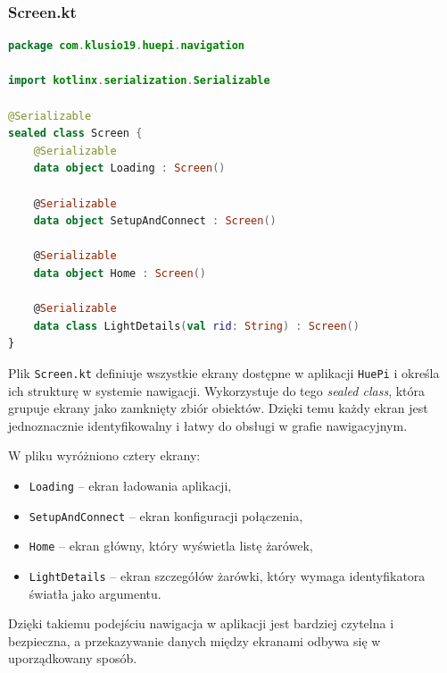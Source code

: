 \documentclass[12pt]{article}
\begin{document}
\subsubsection{Screen.kt}
\begin{lstlisting}[language=Kotlin]
package com.klusio19.huepi.navigation

import kotlinx.serialization.Serializable

@Serializable
sealed class Screen {
    @Serializable
    data object Loading : Screen()

    @Serializable
    data object SetupAndConnect : Screen()

    @Serializable
    data object Home : Screen()

    @Serializable
    data class LightDetails(val rid: String) : Screen()
}
\end{lstlisting}
Plik \texttt{Screen.kt} definiuje wszystkie ekrany dostępne w aplikacji \texttt{HuePi} i określa ich strukturę w systemie nawigacji. Wykorzystuje do tego \textit{sealed class},
która grupuje ekrany jako zamknięty zbiór obiektów. Dzięki temu każdy ekran jest jednoznacznie identyfikowalny i łatwy do obsługi w grafie nawigacyjnym.

W pliku wyróżniono cztery ekrany:
\begin{itemize}
    \item \texttt{Loading} – ekran ładowania aplikacji,
    \item \texttt{SetupAndConnect} – ekran konfiguracji połączenia,
    \item \texttt{Home} – ekran główny, który wyświetla listę żarówek,
    \item \texttt{LightDetails} – ekran szczegółów żarówki, który wymaga identyfikatora światła jako argumentu.
\end{itemize}
Dzięki takiemu podejściu nawigacja w aplikacji jest bardziej czytelna i bezpieczna, a przekazywanie danych między ekranami odbywa się w uporządkowany sposób.

\clearpage
\end{document}
